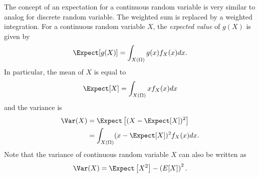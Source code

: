 The concept of an expectation for a continuous random variable is very similar to analog for discrete random variable.
The weighted sum is replaced by a weighted integration.
For a continuous random variable $X$, the \emph{expected value} of $g(X)$ is given by
\begin{equation*}
\Expect [g(X)]
= \int_{X(\Omega)} g(x) f_X (x) dx .
\end{equation*}
In particular, the mean of $X$ is equal to
\begin{equation*}
\Expect [X]
= \int_{X(\Omega)} x f_X (x) dx
\end{equation*}
and the variance is
\begin{equation*}
\begin{split}
\Var (X) &= \Expect \left[ (X - \Expect[X])^2 \right] \\
&= \int_{X(\Omega)} (x - \Expect[X])^2 f_X (x) dx .
\end{split}
\end{equation*}
Note that the variance of continuous random variable $X$ can also be written as
\begin{equation*}
\Var(X) = \Expect \left[ X^2 \right] - \left( E[X] \right)^2 .
\end{equation*}

